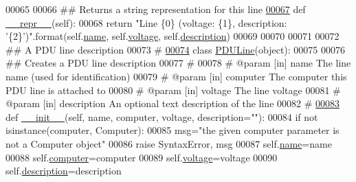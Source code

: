 \begin{DoxyCode}
00065 
00066     \textcolor{comment}{## Returns a string representation for this line}
\hypertarget{settings__classes_8py_source_l00067}{}\hyperlink{classsettings__classes_1_1_line_ad8b9328939df072e4740cd9a63189744}{00067}     \textcolor{keyword}{def }\hyperlink{classsettings__classes_1_1_line_ad8b9328939df072e4740cd9a63189744}{__repr__}(self):
00068         \textcolor{keywordflow}{return} \textcolor{stringliteral}{"Line \{0\} (voltage: \{1\}, description: '\{2\}')"}.format(self.\hyperlink{classsettings__classes_1_1_line_ab74e6bf80237ddc4109968cedc58c151}{name}, 
      self.\hyperlink{classsettings__classes_1_1_line_aa1a8261d8fb901476651f1666f993d4b}{voltage}, self.\hyperlink{classsettings__classes_1_1_line_a2661f439a4a94ffdcd5e47ae1da0bb1d}{description})
00069 
00070 
00071 
00072 \textcolor{comment}{## A PDU line description}
00073 \textcolor{comment}{#}
\hypertarget{settings__classes_8py_source_l00074}{}\hyperlink{classsettings__classes_1_1_p_d_u_line}{00074} \textcolor{keyword}{class }\hyperlink{classsettings__classes_1_1_p_d_u_line}{PDULine}(object):
00075 
00076     \textcolor{comment}{## Creates a PDU line description}
00077     \textcolor{comment}{#}
00078     \textcolor{comment}{# @param [in] name        The line name (used for identification)}
00079     \textcolor{comment}{# @param [in] computer    The computer this PDU line is attached to}
00080     \textcolor{comment}{# @param [in] voltage     The line voltage}
00081     \textcolor{comment}{# @param [in] description An optional text description of the line}
00082     \textcolor{comment}{#}
\hypertarget{settings__classes_8py_source_l00083}{}\hyperlink{classsettings__classes_1_1_p_d_u_line_aa1a8261d8fb901476651f1666f993d4b}{00083}     \textcolor{keyword}{def }\hyperlink{classsettings__classes_1_1_p_d_u_line_ac775ee34451fdfa742b318538164070e}{__init__}(self, name, computer, voltage, description=""):
00084         \textcolor{keywordflow}{if} \textcolor{keywordflow}{not} isinstance(computer, Computer):
00085             msg=\textcolor{stringliteral}{"the given computer parameter is not a Computer object"}
00086             \textcolor{keywordflow}{raise} SyntaxError, msg
00087         self.\hyperlink{classsettings__classes_1_1_p_d_u_line_ab74e6bf80237ddc4109968cedc58c151}{name}=name
00088         self.\hyperlink{classsettings__classes_1_1_p_d_u_line_a98f8cb986fbbcd435b452dc91dc6e8c1}{computer}=computer
00089         self.\hyperlink{classsettings__classes_1_1_p_d_u_line_aa1a8261d8fb901476651f1666f993d4b}{voltage}=voltage
00090         self.\hyperlink{classsettings__classes_1_1_p_d_u_line_a2661f439a4a94ffdcd5e47ae1da0bb1d}{description}=description

\end{DoxyCode}
